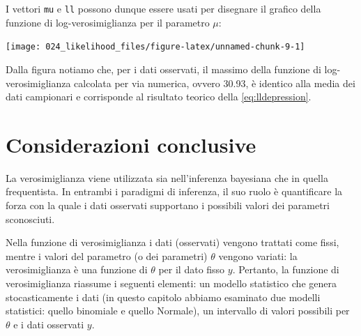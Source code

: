 \documentclass[
]{memoir}
\newenvironment{Shaded}{\begin{snugshade}}{\end{snugshade}}
\newcommand{\AttributeTok}[1]{\textcolor[rgb]{0.77,0.63,0.00}{#1}}
\newcommand{\FunctionTok}[1]{\textcolor[rgb]{0.00,0.00,0.00}{#1}}
\newcommand{\NormalTok}[1]{#1}
\newcommand{\SpecialCharTok}[1]{\textcolor[rgb]{0.00,0.00,0.00}{#1}}
\newcommand{\StringTok}[1]{\textcolor[rgb]{0.31,0.60,0.02}{#1}}
\theoremstyle{definition}
\theoremstyle{definition}
\theoremstyle{definition}
\theoremstyle{definition}
\theoremstyle{remark}
\begin{document}
I vettori \texttt{mu} e \texttt{ll} possono dunque essere usati per disegnare il grafico della funzione di log-verosimiglianza per il parametro \(\mu\):

\begin{Shaded}
\end{Shaded}

\begin{center}\texttt{[image: 024\_likelihood\_files/figure-latex/unnamed-chunk-9-1]} \end{center}

Dalla figura notiamo che, per i dati osservati, il massimo della funzione di log-verosimiglianza calcolata per via numerica, ovvero 30.93, è identico alla media dei dati campionari e corrisponde al risultato teorico della \eqref{eq:lldepression}.

\hypertarget{considerazioni-conclusive}{%
\section*{Considerazioni conclusive}\label{considerazioni-conclusive}}

La verosimiglianza viene utilizzata sia nell'inferenza bayesiana che in quella frequentista. In entrambi i paradigmi di inferenza, il suo ruolo è quantificare la forza con la quale i dati osservati supportano i possibili valori dei parametri sconosciuti.

Nella funzione di verosimiglianza i dati (osservati) vengono trattati come fissi, mentre i valori del parametro (o dei parametri) \(\theta\) vengono variati: la verosimiglianza è una funzione di \(\theta\) per il dato fisso \(y\). Pertanto, la funzione di verosimiglianza riassume i seguenti elementi: un modello statistico che genera stocasticamente i dati (in questo capitolo abbiamo esaminato due modelli statistici: quello binomiale e quello Normale), un intervallo di valori possibili per \(\theta\) e i dati osservati \(y\).
\end{document}
